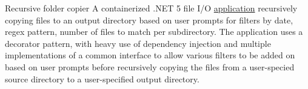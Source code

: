{Recursive folder copier}
{}
{A containerized .NET 5 file I/O \href{https://github.com/JacobArchambault/FolderSearch}{application} recursively copying files to an output directory based on user prompts for filters by date, regex pattern, number of files to match per subdirectory. The application uses a decorator pattern, with heavy use of dependency injection and multiple implementations of a common interface to allow various filters to be added on based on user prompts before recursively copying the files from a user-specied source directory to a user-specified output directory.}
